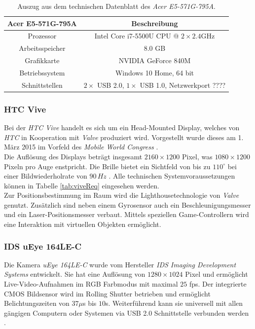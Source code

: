 \begin{table}
	\centering
	\begin{tabular}{|c|c|}
		\hline
		\Absatzbox{}
		\textbf{Acer E5-571G-795A}& \textbf{Beschreibung} \\
		\hline
		Prozessor & Intel Core i7-5500U CPU @ $2\times 2.4$GHz  \\
		\hline
		Arbeitsspeicher & $8.0$ GB \\
		\hline 
		Grafikkarte & NVIDIA GeForce 840M\\
		\hline
		Betriebssystem & Windows 10 Home, 64 bit \\
		\hline
		Schnittstellen & $2\times$ USB 2.0, $1\times$ USB 1.0, Netzwerkport ????\\
		\hline
	\end{tabular}
	\caption{Auszug aus dem technischen Datenblatt des \textit{Acer E5-571G-795A}.}
	\label{tab:TrackingCompParam}
\end{table}


\subsubsection{HTC Vive}\label{sec:Vive} 
Bei der \textit{HTC Vive} handelt es sich um ein Head-Mounted Display, welches von \textit{HTC} in Kooperation mit \textit{Valve} \cite{website:Valve} produziert wird. Vorgestellt wurde dieses am 1. März 2015 im Vorfeld des \textit{Mobile World Congress} \cite{website:mobileworldcongress}.\\
Die Auflösung des Displays beträgt insgesamt $2160\times1200$ Pixel, was $1080\times1200$ Pixeln pro Auge enstpricht. Die Brille bietet ein Sichtfeld von bis zu $110^\circ$ bei einer Bildwiederholrate von $90\,Hz$ \cite{website:HTC_Vive}. Alle technischen Systemvoraussetzungen können in Tabelle \ref{tab:viveReq} eingesehen werden. \\
Zur Positionsbestimmung im Raum wird die Lighthousetechnologie von \textit{Valve} genutzt. Zusätzlich sind neben einem Gyrosensor auch ein Beschleunigungsmesser und ein Laser-Positionsmesser verbaut. Mittels speziellen Game-Controllern wird eine Interaktion mit virtuellen Objekten ermöglicht.

\subsubsection{IDS uEye 164LE-C}\label{sec:uEye} 
Die Kamera \textit{uEye 164LE-C} wurde vom Hersteller \textit{IDS Imaging Development Systems} entwickelt. Sie hat eine Auflösung von $1280 \times 1024$ Pixel und ermöglicht Live-Video-Aufnahmen im RGB Farbmodus mit maximal $25$ fps. Der integrierte CMOS Bildsensor wird im Rolling Shutter betrieben und ermöglicht Belichtungszeiten von $37\mu$s bis $10$s. Weiterführend kann sie universell mit allen gängigen Computern oder Systemen via USB 2.0 Schnittstelle verbunden werden \cite{website:UEyeTechSpec}.\\

